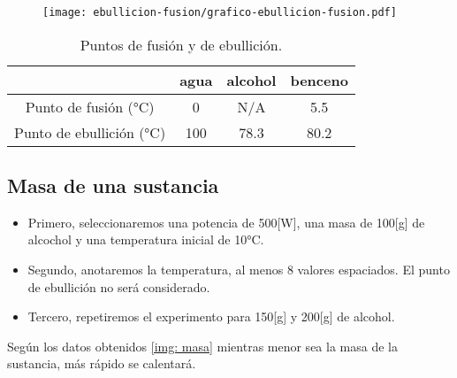 \documentclass[a4paper, 12p]{article}
\begin{document}
\begin{figure}[H]
      \centering
      \texttt{[image: ebullicion-fusion/grafico-ebullicion-fusion.pdf]}
      \label{img: ebullicion-fusion}      
\end{figure}


\begin{table}[H]
    \centering
 \begin{tabular}{|c|c|c|c|}\hline
                            &  agua &  alcohol  &   benceno  \\ \hline
 Punto de fusión (°C)       &   0   &  N/A      &    5.5      \\ \hline
 Punto de ebullición (°C)   &   100 &    78.3   &    80.2      \\ \hline
    
 \end{tabular}
 \label{tab:ebullicion-fusion2} 
 \caption{ Puntos de fusión y de ebullición.}
\end{table}



\subsection{Masa de una sustancia}
\begin{itemize}
      \item Primero, seleccionaremos una potencia de 500[W], una masa de 100[g] 
      de alcochol y una temperatura inicial de 10°C.
      \item  Segundo, anotaremos la temperatura, al menos 8 valores espaciados. El punto de ebullición no será considerado.
      \item Tercero, repetiremos el experimento para 150[g] y 200[g] de alcohol.
\end{itemize}
Según los datos obtenidos \ref{img: masa} mientras menor sea la masa de la sustancia, más rápido se calentará.
\end{document}
